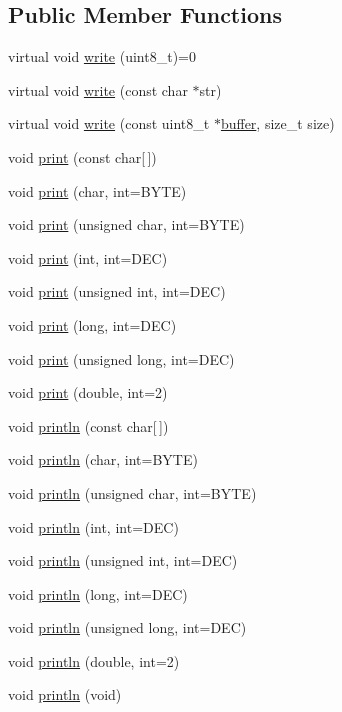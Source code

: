 \subsection*{Public Member Functions}
\begin{DoxyCompactItemize}
\item 
virtual void \hyperlink{class_print_ad9393033793cfc17f3e37202ba244892}{write} (uint8\_\-t)=0
\item 
virtual void \hyperlink{class_print_ae083258d224bae2e5d8a27a4f8338880}{write} (const char $\ast$str)
\item 
virtual void \hyperlink{class_print_a03094428e21f210e59cc1be63353225d}{write} (const uint8\_\-t $\ast$\hyperlink{_i_m_u_manager_8cpp_a858e0513a46bec1d794f9487c41a969d}{buffer}, size\_\-t size)
\item 
void \hyperlink{class_print_aa7b0a6dc63e3d27effd8459e3d443b83}{print} (const char\mbox{[}$\,$\mbox{]})
\item 
void \hyperlink{class_print_ada24638921c2e86e13c5939c94cf67db}{print} (char, int=BYTE)
\item 
void \hyperlink{class_print_ad7778084a6fe96551d2ec9ce532c5164}{print} (unsigned char, int=BYTE)
\item 
void \hyperlink{class_print_a35a6196999c85e5afc5fd852d088e886}{print} (int, int=DEC)
\item 
void \hyperlink{class_print_a5f8df5d4f941b411ce9d660b48996bea}{print} (unsigned int, int=DEC)
\item 
void \hyperlink{class_print_afab3f8d07a58a8d37fec32d7fcb67b56}{print} (long, int=DEC)
\item 
void \hyperlink{class_print_a4be58e920bdddcaf5496d0ba2ae4ea81}{print} (unsigned long, int=DEC)
\item 
void \hyperlink{class_print_aa5fe80d3a3e8d2dc64f346eb08dcb43f}{print} (double, int=2)
\item 
void \hyperlink{class_print_a09db74a8d51c6b2420c478267f958a51}{println} (const char\mbox{[}$\,$\mbox{]})
\item 
void \hyperlink{class_print_a49bbefc9016ddda486edf3dddaaa07e9}{println} (char, int=BYTE)
\item 
void \hyperlink{class_print_a4eaaf09c278a5927ba2ddcffb6b01e64}{println} (unsigned char, int=BYTE)
\item 
void \hyperlink{class_print_a350bdfe3569acb05a2fdefb7c54e292d}{println} (int, int=DEC)
\item 
void \hyperlink{class_print_af0aeb581689c6e9c9f8331b342a91e20}{println} (unsigned int, int=DEC)
\item 
void \hyperlink{class_print_a1999020b07369721caa16c52fdba4341}{println} (long, int=DEC)
\item 
void \hyperlink{class_print_aacf64fb9630526fb6c666f038a9dc4e6}{println} (unsigned long, int=DEC)
\item 
void \hyperlink{class_print_a4302b58946b9355b0491118227beed07}{println} (double, int=2)
\item 
void \hyperlink{class_print_a525b37c566658ff8113a067f6e8d5bf1}{println} (void)
\end{DoxyCompactItemize}

